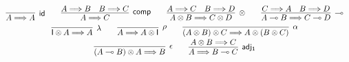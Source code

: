 \documentclass[submission,copyright,creativecommons]{eptcs}
\theoremstyle{definition}
\newcommand{\id}{\mathsf{id}}
\newcommand{\ot}{\otimes}
\newcommand{\lolli}{\multimap}
\newcommand{\I}{\mathsf{I}}
\begin{document}
\begin{displaymath}
  \def\arraystretch{1.55}
  \begin{array}{c}
        \infer[\id]{A \Longrightarrow A}{}
        \qquad
        \infer[\mathsf{comp}]{A \Longrightarrow C}{
          A \Longrightarrow B
          &
          B \Longrightarrow C
        }
        \qquad
      \infer[\otimes]{A \ot B \Longrightarrow C \ot D}{
        A \Longrightarrow C
        &
        B \Longrightarrow D
      }
      \qquad
      \infer[\lolli]{A \lolli B \Longrightarrow C \lolli D}{
        C \Longrightarrow A
        &
        B \Longrightarrow D
      }
      \\
      \infer[\lambda]{\I \ot A \Longrightarrow A}{}
      \qquad
      \infer[\rho]{A \Longrightarrow A \ot \I}{}
      \qquad
      \infer[\alpha]{(A \ot B) \ot C \Longrightarrow A \ot (B \ot C)}{}
      \\
      \infer[\epsilon]{(A \lolli B) \ot A \Longrightarrow B}{}
      \qquad
      \infer[\mathsf{adj_1}]{A \Longrightarrow B \lolli C}{A \ot B \Longrightarrow C}
  \end{array}
\end{displaymath}
\end{document}
